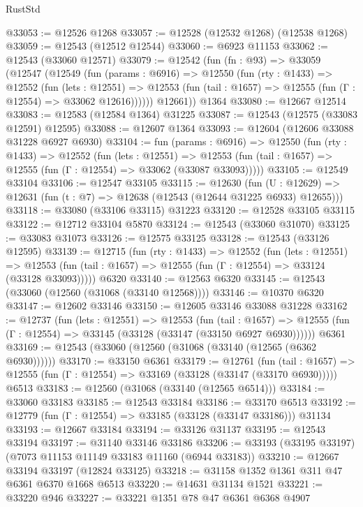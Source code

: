 \begin{lexlean}{RustStd}
\begin{coremodule}
@33053 := @12526 @1268
@33057 := @12528 (@12532 @1268) (@12538 @1268)
@33059 := @12543 (@12512 @12544)
@33060 := @6923 @11153
@33062 := @12543 (@33060 @12571)
@33079 := @12542
    (fun (fn : @93) =>
    @33059
      (@12547
        (@12549
          (fun (params : @6916) =>
          @12550
            (fun (rty : @1433) =>
            @12552
              (fun (lets : @12551) =>
              @12553 (fun (tail : @1657) => @12555 (fun (Γ : @12554) => @33062 @12616))))))
        @12661))
    @1364
@33080 := @12667 @12514
@33083 := @12583 (@12584 @1364) @31225
@33087 := @12543 (@12575 (@33083 @12591) @12595)
@33088 := @12607 @1364
@33093 := @12604 (@12606 @33088 @31228 @6927 @6930)
@33104 := fun (params : @6916) =>
  @12550
    (fun (rty : @1433) =>
    @12552
      (fun (lets : @12551) =>
      @12553 (fun (tail : @1657) => @12555 (fun (Γ : @12554) => @33062 (@33087 @33093)))))
@33105 := @12549 @33104
@33106 := @12547 @33105
@33115 := @12630
    (fun (U : @12629) => @12631 (fun (t : @7) => @12638 (@12543 (@12644 @31225 @6933) @12655)))
@33118 := @33080 (@33106 @33115) @31223
@33120 := @12528 @33105 @33115
@33122 := @12712 @33104 @5870
@33124 := @12543 (@33060 @31070)
@33125 := @33083 @31073
@33126 := @12575 @33125
@33128 := @12543 (@33126 @12595)
@33139 := @12715
    (fun (rty : @1433) =>
    @12552
      (fun (lets : @12551) =>
      @12553 (fun (tail : @1657) => @12555 (fun (Γ : @12554) => @33124 (@33128 @33093)))))
    @6320
@33140 := @12563 @6320
@33145 := @12543 (@33060 (@12560 (@31068 (@33140 @12568))))
@33146 := @10370 @6320
@33147 := @12602 @33146
@33150 := @12605 @33146 @33088 @31228
@33162 := @12737
    (fun (lets : @12551) =>
    @12553
      (fun (tail : @1657) =>
      @12555 (fun (Γ : @12554) => @33145 (@33128 (@33147 (@33150 @6927 @6930))))))
    @6361
@33169 := @12543 (@33060 (@12560 (@31068 (@33140 (@12565 (@6362 @6930))))))
@33170 := @33150 @6361
@33179 := @12761
    (fun (tail : @1657) => @12555 (fun (Γ : @12554) => @33169 (@33128 (@33147 (@33170 @6930)))))
    @6513
@33183 := @12560 (@31068 (@33140 (@12565 @6514)))
@33184 := @33060 @33183
@33185 := @12543 @33184
@33186 := @33170 @6513
@33192 := @12779 (fun (Γ : @12554) => @33185 (@33128 (@33147 @33186))) @31134
@33193 := @12667 @33184
@33194 := @33126 @31137
@33195 := @12543 @33194
@33197 := @31140 @33146 @33186
@33206 := @33193 (@33195 @33197) (@7073 @11153 @11149 @33183 @11160 (@6944 @33183))
@33210 := @12667 @33194 @33197 (@12824 @33125)
@33218 := @31158 @1352 @1361 @311 @47 @6361 @6370 @1668 @6513
@33220 := @14631 @31134 @1521
@33221 := @33220 @946
@33227 := @33221 @1351 @78 @47 @6361 @6368 @4907

\end{coremodule}
\end{lexlean}

